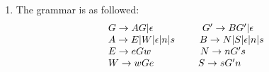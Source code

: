 \documentclass[11pt]{article}
\begin{document}
\begin{enumerate}
\item
The grammar is as followed:
\[
\begin{array}{lr}
	G\rightarrow AG|\epsilon\hspace*{5em} G'\rightarrow BG'|\epsilon \\
	A\rightarrow E | W | \epsilon |n | s\hspace*{2.5em} B\rightarrow N|S|\epsilon|n|s \\
	E\rightarrow eGw \hspace*{5em}N\rightarrow nG's\\
	W\rightarrow wGe \hspace*{4.5em}S\rightarrow sG'n
\end{array}
\]

\end{enumerate}
\end{document}

